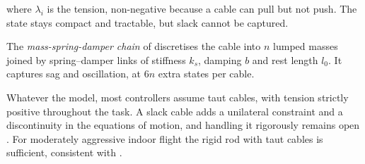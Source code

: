 where $\lambda_i$ is the tension, non-negative because a cable can pull but not push. The state stays compact and tractable, but slack cannot be captured.

The \textit{mass-spring-damper chain} of \cite{distributedNMPC} discretises the cable into $n$ lumped masses joined by spring--damper links of stiffness $k_s$, damping $b$ and rest length $l_0$. It captures sag and oscillation, at $6n$ extra states per cable.

Whatever the model, most controllers assume taut cables, with tension strictly positive throughout the task. A slack cable adds a unilateral constraint and a discontinuity in the equations of motion, and handling it rigorously remains open \cite{efficient}. For moderately aggressive indoor flight the rigid rod with taut cables is sufficient, consistent with \cite{tudelft}.
